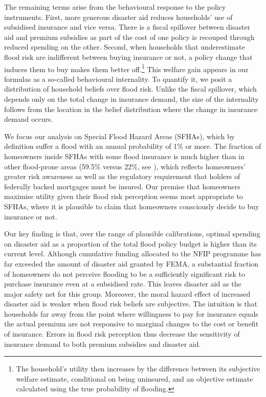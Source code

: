 \documentclass[12pt]{article}
\begin{document}
The remaining terms arise from the behavioural response to the policy instruments. First,  more generous disaster aid reduces households' use of subsidised insurance and vice versa. There is a fiscal spillover between disaster aid and premium subsidies as part of the cost of one policy is recouped through reduced spending on the other. Second, when households that underestimate flood risk are indifferent between buying insurance or not, a policy change that induces them to buy makes them better off.\footnote{The household's utility then increases by the difference between its subjective welfare estimate, conditional on being uninsured, and an objective estimate calculated using the true probability of flooding.}  This welfare gain appears in our formulas as a so-called behavioural internality. To quantify it, we posit a distribution of household beliefs over flood risk. Unlike the fiscal spillover, which depends only on the total change in insurance demand, the size of the internality follows from the location in the belief distribution where the change in insurance demand occurs.

We focus our analysis on Special Flood Hazard Areas (SFHAs), which by definition suffer a flood with an annual probability of 1$\%$ or more. The fraction of homeowners inside SFHAs with some flood insurance is much higher than in other flood-prone areas (59.5$\%$ versus 22$\%$, see \cite{amornsiripanitch2025measuring}), which reflects homeowners' greater risk awareness as well as the regulatory requirement that holders of federally backed mortgages must be insured. Our premise that homeowners maximise utility given their flood risk perception seems most appropriate to SFHAs, where it is plausible to claim that homeowners consciously decide to buy insurance or not.  

Our key finding is that, over the range of plausible calibrations, optimal spending on disaster aid as a proportion of the total flood policy budget is higher than its current level. Although cumulative funding allocated to the NFIP programme has far exceeded the amount of disaster aid granted by FEMA, a substantial fraction of homeowners do not perceive flooding to be a sufficiently significant risk to purchase insurance even at a subsidised rate. This leaves disaster aid as the major safety net for this group. Moreover, the moral hazard effect of increased disaster aid is weaker when flood risk beliefs are subjective. The intuition is that households far away from the point where willingness to pay for insurance equals the actual premium are not responsive to marginal changes to the cost or benefit of insurance. Errors in flood risk perception thus decrease the sensitivity of insurance demand to both premium subsidies and disaster aid.    
\end{document}
